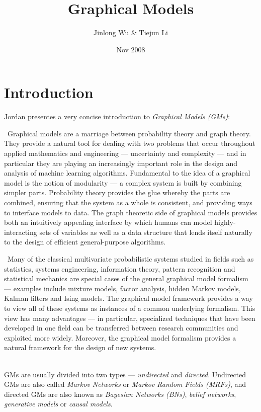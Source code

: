 \documentclass{article}
\title{Graphical Models}
\author{Jinlong Wu \& Tiejun Li}
\date{Nov 2008}
\begin{document}
\maketitle
\section{Introduction}
Jordan \cite{Jordan} presentes a very concise introduction to \textit{Graphical Models (GMs)}:

\begin{minipage}[c]{0.94\textwidth}
\quad\ \textsf{Graphical models are a marriage between probability theory and graph theory. They provide
a natural tool for dealing with two problems that occur throughout applied mathematics and
engineering --- uncertainty and complexity --- and in particular they are playing an increasingly
important role in the design and analysis of machine learning algorithms. Fundamental to the
idea of a graphical model is the notion of modularity --- a complex system is built by combining
simpler parts. Probability theory provides the glue whereby the parts are combined, ensuring
that the system as a whole is consistent, and providing ways to interface models to data. The
graph theoretic side of graphical models provides both an intuitively appealing interface by which
humans can model highly-interacting sets of variables as well as a data structure that lends itself
naturally to the design of efficient general-purpose algorithms.}

\quad\ \textsf{Many of the classical multivariate probabilistic systems studied in fields such as statistics,
systems engineering, information theory, pattern recognition and statistical mechanics are special
cases of the general graphical model formalism --- examples include mixture models, factor analysis,
hidden Markov models, Kalman filters and Ising models. The graphical model framework provides
a way to view all of these systems as instances of a common underlying formalism. This view has
many advantages --- in particular, specialized techniques that have been developed in one field can
be transferred between research communities and exploited more widely. Moreover, the graphical
model formalism provides a natural framework for the design of new systems.
}
\end{minipage}\\

GMs are usually divided into two types --- \textit{undirected} and \textit{directed}.
Undirected GMs are also called \textit{Markov Networks} or \textit{Markov Random Fields (MRFs)},
and directed GMs are also known as \textit{Bayesian Networks (BNs)}, \textit{belief networks},
\textit{generative models} or \textit{causal models}.
\end{document}

